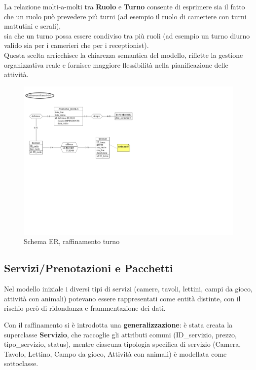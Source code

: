 \documentclass[a4paper,12pt]{report}
\begin{document}
\vspace{\baselineskip}
La relazione molti-a-molti tra \textbf{Ruolo} e \textbf{Turno} consente di esprimere sia il fatto
che un ruolo può prevedere più turni (ad esempio il ruolo di cameriere con turni mattutini e serali),\\
sia che un turno possa essere condiviso tra più ruoli (ad esempio un turno diurno valido sia
per i camerieri che per i receptionist).\\
Questa scelta arricchisce la chiarezza semantica del modello, riflette la gestione organizzativa reale
e fornisce maggiore flessibilità nella pianificazione delle attività.\\

\begin{figure}[H]
	\centering
	\includegraphics[width=\textwidth, trim=0 250pt 300pt 0, clip]{./pdf/raffinamento turno.pdf}
	\caption{Schema ER, raffinamento turno}
	\label{fig:raffinamento-turno}
\end{figure}

\newpage


\subsection{Servizi/Prenotazioni e Pacchetti}
Nel modello iniziale i diversi tipi di servizi (camere, tavoli, lettini, campi da gioco, attività con animali) potevano essere
rappresentati come entità distinte, con il rischio però di ridondanza e frammentazione dei dati.

\vspace{\baselineskip}
Con il raffinamento si è introdotta una \textbf{generalizzazione}: è stata creata la superclasse \textbf{Servizio}, che raccoglie gli attributi comuni (ID\_servizio,
prezzo, tipo\_servizio, status), mentre ciascuna tipologia specifica di servizio (Camera, Tavolo, Lettino, Campo da gioco,
Attività con animali) è modellata come sottoclasse.
\end{document}
